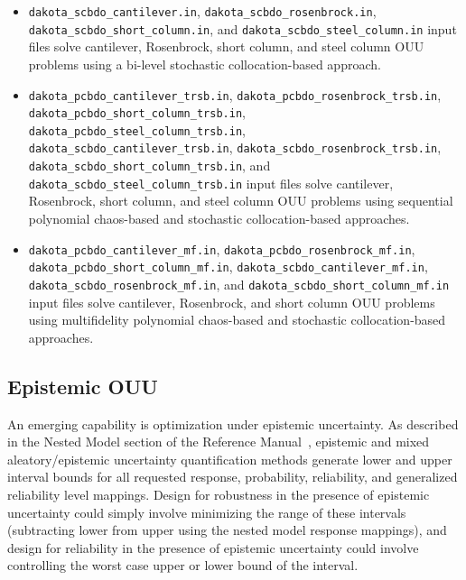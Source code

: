 \begin{itemize}
\item \texttt{dakota\_scbdo\_cantilever.in}, 
\texttt{dakota\_scbdo\_rosenbrock.in}, \\
\texttt{dakota\_scbdo\_short\_column.in}, and
\texttt{dakota\_scbdo\_steel\_column.in} input files solve 
cantilever, Rosenbrock, short column, and steel column OUU problems
using a bi-level stochastic collocation-based approach.

\item \texttt{dakota\_pcbdo\_cantilever\_trsb.in},
\texttt{dakota\_pcbdo\_rosenbrock\_trsb.in}, \\
\texttt{dakota\_pcbdo\_short\_column\_trsb.in}, 
\texttt{dakota\_pcbdo\_steel\_column\_trsb.in},\\
\texttt{dakota\_scbdo\_cantilever\_trsb.in}, 
\texttt{dakota\_scbdo\_rosenbrock\_trsb.in}, \\
\texttt{dakota\_scbdo\_short\_column\_trsb.in}, and
\texttt{dakota\_scbdo\_steel\_column\_trsb.in} input files solve 
cantilever, Rosenbrock, short column, and steel column OUU problems
using sequential polynomial chaos-based and stochastic
collocation-based approaches.

\item \texttt{dakota\_pcbdo\_cantilever\_mf.in},
\texttt{dakota\_pcbdo\_rosenbrock\_mf.in}, \\
\texttt{dakota\_pcbdo\_short\_column\_mf.in}, 
\texttt{dakota\_scbdo\_cantilever\_mf.in}, \\
\texttt{dakota\_scbdo\_rosenbrock\_mf.in}, and
\texttt{dakota\_scbdo\_short\_column\_mf.in} input files solve 
cantilever, Rosenbrock, and short column OUU problems
using multifidelity polynomial chaos-based and stochastic
collocation-based approaches.
\end{itemize}


\subsection{Epistemic OUU} \label{adv_models:ouu:epistemic}

An emerging capability is optimization under epistemic uncertainty.
As described in the Nested Model section of the Reference
Manual~\cite{RefMan}, epistemic and mixed aleatory/epistemic
uncertainty quantification methods generate lower and upper interval
bounds for all requested response, probability, reliability, and
generalized reliability level mappings.  Design for robustness in the
presence of epistemic uncertainty could simply involve minimizing the
range of these intervals (subtracting lower from upper using the
nested model response mappings), and design for reliability in the
presence of epistemic uncertainty could involve controlling the worst
case upper or lower bound of the interval.


